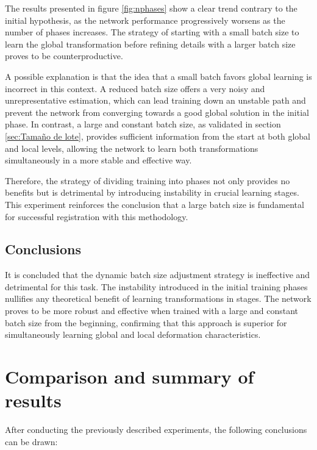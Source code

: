 The results presented in figure \ref{fig:nphases} show a clear trend contrary to the initial hypothesis, as the network performance progressively worsens as the number of phases increases. The strategy of starting with a small batch size to learn the global transformation before refining details with a larger batch size proves to be counterproductive.

A possible explanation is that the idea that a small batch favors global learning is incorrect in this context. A reduced batch size offers a very noisy and unrepresentative estimation, which can lead training down an unstable path and prevent the network from converging towards a good global solution in the initial phase. In contrast, a large and constant batch size, as validated in section \ref{sec:Tamaño de lote}, provides sufficient information from the start at both global and local levels, allowing the network to learn both transformations simultaneously in a more stable and effective way.

Therefore, the strategy of dividing training into phases not only provides no benefits but is detrimental by introducing instability in crucial learning stages. This experiment reinforces the conclusion that a large batch size is fundamental for successful registration with this methodology.

\subsection{Conclusions}
\label{subsec:Conclusions-phases}

It is concluded that the dynamic batch size adjustment strategy is ineffective and detrimental for this task. The instability introduced in the initial training phases nullifies any theoretical benefit of learning transformations in stages. The network proves to be more robust and effective when trained with a large and constant batch size from the beginning, confirming that this approach is superior for simultaneously learning global and local deformation characteristics.


\section{Comparison and summary of results}
\label{sec:Comparativa e resumo}

After conducting the previously described experiments, the following conclusions can be drawn:

